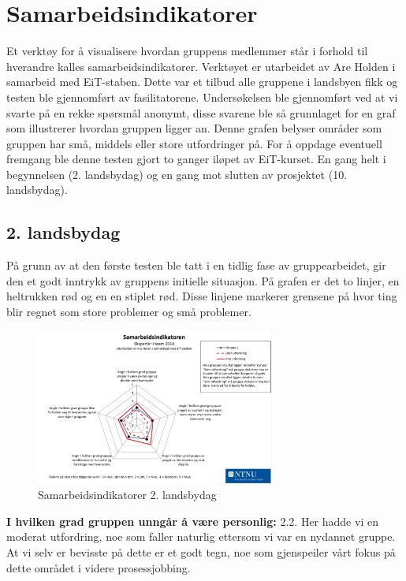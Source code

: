 \section{Samarbeidsindikatorer}
Et verktøy for å visualisere hvordan gruppens medlemmer står i forhold til hverandre kalles samarbeidsindikatorer. 
Verktøyet er utarbeidet av Are Holden i samarbeid med EiT-staben. 
Dette var et tilbud alle gruppene i landsbyen fikk og testen ble gjennomført av fasilitatorene. 
Undersøkelsen ble gjennomført ved at vi svarte på en rekke spørsmål anonymt, disse svarene ble så grunnlaget for en graf som illustrerer hvordan gruppen ligger an.
Denne grafen belyser områder som gruppen har små, middels eller store utfordringer på. 
For å oppdage eventuell fremgang ble denne testen gjort to ganger iløpet av EiT-kurset. En gang helt i begynnelsen (2. landsbydag) og en gang mot slutten av prosjektet (10. landsbydag). 

\subsection{2. landsbydag}
På grunn av at den første testen ble tatt i en tidlig fase av gruppearbeidet, gir den et godt inntrykk av gruppens initielle situasjon. 
På grafen er det to linjer, en heltrukken rød og en en stiplet rød. 
Disse linjene markerer grensene på hvor ting blir regnet som store problemer og små problemer. 
\begin{figure}[H]
    \centering
    \includegraphics[width=0.7\textwidth]{images/samarbeidsindikator1.jpeg} 
    \caption{Samarbeidsindikatorer 2. landsbydag}
    \label{fig:sam1}
\end{figure}

\noindent \textbf{I hvilken grad gruppen unngår å være personlig:} 2.2.
\newline
\noindent Her hadde vi en moderat utfordring, noe som faller naturlig ettersom vi var en nydannet gruppe.
 At vi selv er bevisste på dette er et godt tegn, noe som gjenspeiler vårt fokus på dette området i videre prosessjobbing.
\vspace{\secspace}

